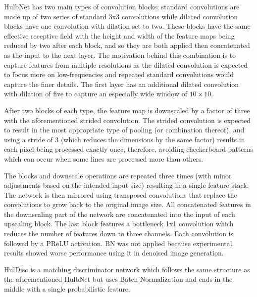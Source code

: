 HulbNet has two main types of convolution blocks; standard convolutions are made up of two series of standard 3x3 convolutions while dilated convolution blocks have one convolution with dilation set to two. These blocks have the same effective receptive field with the height and width of the feature maps being reduced by two after each block, and so they are both applied then concatenated as the input to the next layer. The motivation behind this combination is to capture features from multiple resolutions as the dilated convolution is expected to focus more on low-frequencies and repeated standard convolutions would capture the finer details. The first layer has an additional dilated convolution with dilation of five to capture an especially wide window of $10\times 10$.

After two blocks of each type, the feature map is downscaled by a factor of three with the aforementioned strided convolution. The strided convolution is expected to result in the most appropriate type of pooling (or combination thereof), and using a stride of 3 (which reduces the dimensions by the same factor) results in each pixel being processed exactly once, therefore, avoiding checkerboard patterns which can occur when some lines are processed more than others.

The blocks and downscale operations are repeated three times (with minor adjustments based on the intended input size) resulting in a single feature stack. The network is then mirrored using transposed convolutions that replace the convolutions to grow back to the original image size. All concatenated features in the downscaling part of the network are concatenated into the input of each upscaling block. The last block features a bottleneck 1x1 convolution which reduces the number of features down to three channels.
Each convolution is followed by a \ac{PReLU} activation. \acl{BN} was not applied because experimental results showed worse performance using it in denoised image generation.

HulDisc is a matching discriminator network which follows the same structure as the aforementioned HulbNet but uses Batch Normalization and ends in the middle with a single probabilistic feature. %

